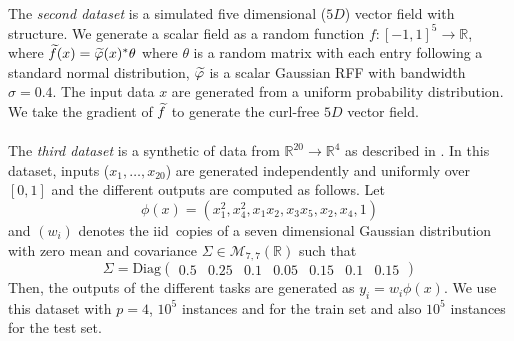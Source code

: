 \paragraph{}
The \emph{second dataset} is a simulated five dimensional ($5D$) vector field
with structure. We generate a scalar field as a random function
$f:[-1,1]^5\to\mathbb{R}$, where
$\widetilde{f}(x)=\widetilde{\varphi}(x)^* \theta$ where $\theta$ is a
random matrix with each entry following a standard normal distribution,
$\widetilde{\varphi}$ is a scalar Gaussian RFF with bandwidth $\sigma=0.4$. The
input data $x$ are generated from a uniform probability distribution. We take
the gradient of $\widetilde{f}$ to generate the curl-free $5D$ vector field.
\paragraph{}
The \emph{third dataset} is a synthetic of data from
$\mathbb{R}^{20}\to\mathbb{R}^4$ as described in \citet{audiffren2013online}.
In this dataset, inputs ($x_1, \hdots, x_{20}$) are generated independently and
uniformly over $[0, 1]$ and the different outputs are computed as follows. Let
\begin{dmath*}
    \phi(x)=(x_1^2, x_4^2, x_1x_2, x_3x_5, x_2, x_4, 1)
\end{dmath*}
and $(w_i)$ denotes the \acs{iid}~copies of a seven dimensional Gaussian
distribution with zero mean and covariance
$\Sigma\in\mathcal{M}_{7,7}(\mathbb{R})$ such that
\begin{dmath*}
    \Sigma=\text{Diag}
    \begin{pmatrix}
        0.5 & 0.25 & 0.1 & 0.05 & 0.15 & 0.1 & 0.15
    \end{pmatrix}
\end{dmath*}
Then, the outputs of the different tasks are generated as $y_i=w_i\phi(x)$. We
use this dataset with $p=4$, $10^5$ instances and for the train set and also
$10^5$ instances for the test set.

